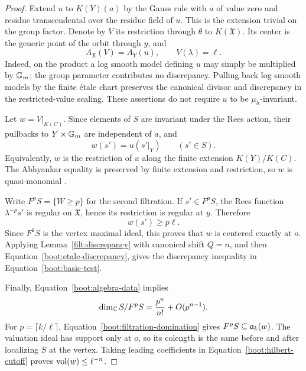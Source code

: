 \begin{proof}
Extend $u$ to $K(Y)(a)$ by the Gauss rule with $a$ of value zero
and residue transcendental over the residue field of $u$.
This is the extension trivial on the group factor.  Denote by $V$
its restriction through $\theta$ to $K(\mathfrak X)$.  Its center
is the generic point of the orbit through $y$, and
\begin{equation}
 \label{boot:etale-discrepancy}
 A_{\mathfrak X}(V)=A_Y(u),
 \qquad V(\lambda)=\ell.
\end{equation}
Indeed, on the product a log smooth model defining $u$ may simply
be multiplied by $\mathbb G_m$; the group parameter contributes no
discrepancy.  Pulling back log smooth models by the finite étale
chart preserves the canonical divisor and discrepancy in the
restricted-value scaling.  These assertions do not require $u$
to be $\mu_h$-invariant.

Let $w=V|_{K(C)}$.  Since elements of $S$ are invariant under the
Rees action, their pullbacks to $Y\times\mathbb G_m$ are independent of
$a$, and
\begin{equation}
 \label{boot:restriction-values}
 w(s')=u(s'|_Y)\qquad(s'\in S).
\end{equation}
Equivalently, $w$ is the restriction of $u$ along the finite
extension $K(Y)/K(C)$.  The Abhyankar equality is preserved by
finite extension and restriction, so $w$ is quasi-monomial
\cite[Proposition~3.7]{JM12}.

Write $F^pS=\{W\geq p\}$ for the second filtration.  If
$s'\in F^pS$, the Rees function $\lambda^{-p}s'$ is regular on
$\mathfrak X$, hence its restriction is regular at $y$.  Therefore
\begin{equation}
 \label{boot:filtration-domination}
 w(s')\geq p\ell.
\end{equation}
Since $F^1S$ is the vertex maximal ideal, this proves that $w$ is
centered exactly at $o$.  Applying
Lemma~\ref{filt:discrepancy} with canonical shift $Q=n$, and then
Equation~\eqref{boot:etale-discrepancy}, gives the discrepancy
inequality in Equation~\eqref{boot:basic-test}.

Finally, Equation~\eqref{boot:algebra-data} implies
\begin{equation}
 \label{boot:hilbert-cutoff}
 \dim_\mathbb C S/F^pS=\frac{p^n}{n!}+O(p^{n-1}).
\end{equation}
For $p=\lceil k/\ell\rceil$, Equation~\eqref{boot:filtration-domination}
gives $F^pS\subseteq\mathfrak a_k(w)$.  The valuation ideal has support
only at $o$, so its colength is the same before and after
localizing $S$ at the vertex.  Taking leading coefficients in
Equation~\eqref{boot:hilbert-cutoff} proves
$\operatorname{vol}(w)\leq\ell^{-n}$.
\end{proof}

